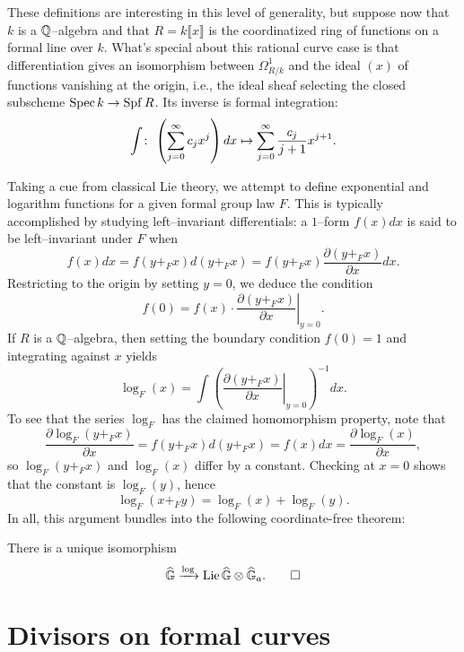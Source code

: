 These definitions are interesting in this level of generality, but suppose now that $k$ is a $\mathbb{Q}$--algebra and that $R = k\llbracket x \rrbracket$ is the coordinatized ring of functions on a formal line over $k$.  What's special about this rational curve case is that differentiation gives an isomorphism between $\Omega^1_{R/k}$ and the ideal $(x)$ of functions vanishing at the origin, i.e., the ideal sheaf selecting the closed subscheme $\operatorname{Spec} k \to \operatorname{Spf} R$.  Its inverse is formal integration: \[\int \colon\thinspace \left(\sum_{j=0}^\infty c_j x^j \right) dx \mapsto \sum_{j=0}^\infty \frac{c_j}{j+1} x^{j+1}.\]

Taking a cue from classical Lie theory, we attempt to define exponential and logarithm functions for a given formal group law $F$.  This is typically accomplished by studying left--invariant differentials: a $1$--form $f(x) dx$ is said to be left--invariant under $F$ when \[f(x) dx = f(y +_F x) d(y +_F x) = f(y +_F x) \frac{\partial(y +_F x)}{\partial x} dx.\]  Restricting to the origin by setting $y = 0$, we deduce the condition \[f(0) = f(x) \cdot \left. \frac{\partial(y +_F x)}{\partial x} \right|_{y=0}.\]  If $R$ is a $\mathbb{Q}$--algebra, then setting the boundary condition $f(0) = 1$ and integrating against $x$ yields \[\log_F(x) = \int \left( \left. \frac{\partial(y +_F x)}{\partial x} \right|_{y=0} \right)^{-1} dx.\]  To see that the series $\log_F$ has the claimed homomorphism property, note that \[\frac{\partial \log_F(y +_F x)}{\partial x} = f(y +_F x) d(y +_F x) = f(x) dx = \frac{\partial \log_F(x)}{\partial x},\] so $\log_F(y +_F x)$ and $\log_F(x)$ differ by a constant.  Checking at $x = 0$ shows that the constant is $\log_F(y)$, hence \[\log_F(x +_F y) = \log_F(x) + \log_F(y).\]  In all, this argument bundles into the following coordinate-free theorem:
\begin{theorem}\label{RationalFGLsHaveLogarithms}
There is a unique isomorphism \[\widehat{\mathbb G} \xrightarrow{\log} \operatorname{Lie} \widehat{\mathbb G} \otimes \widehat{\mathbb G}_a. \qed\]
\end{theorem}







\section{Divisors on formal curves}

